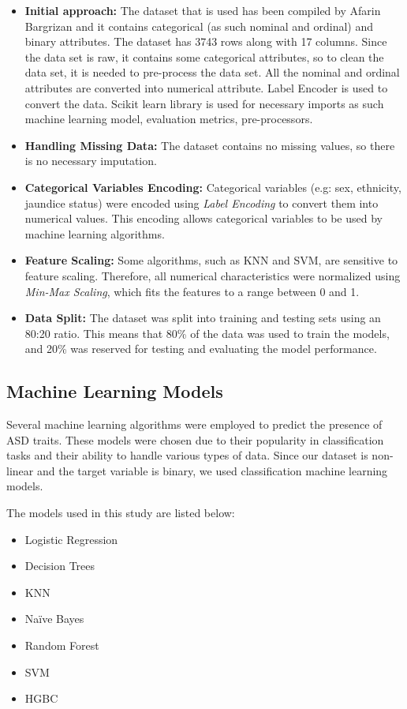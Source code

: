 \documentclass[pdflatex,sn-nature]{sn-jnl}
\theoremstyle{thmstyleone}%
\theoremstyle{thmstyletwo}%
\theoremstyle{thmstylethree}%
\begin{document}
\begin{itemize}
    \item \textbf{Initial approach:} The dataset that is used has been compiled by Afarin Bargrizan and it contains categorical (as such nominal and ordinal) and binary attributes. The dataset has 3743 rows along with 17 columns. Since the data set is raw, it contains some categorical attributes, so to clean the data set, it is needed to pre-process the data set. All the nominal and ordinal attributes are converted into numerical attribute. Label Encoder is used to convert the data. Scikit learn library is used for necessary imports as such machine learning model, evaluation metrics, pre-processors.
    \item \textbf{Handling Missing Data:} The dataset contains no missing values, so there is no necessary imputation.
    \item \textbf{Categorical Variables Encoding:} Categorical variables (e.g: sex, ethnicity, jaundice status) were encoded using \textit{Label Encoding} to convert them into numerical values. This encoding allows categorical variables to be used by machine learning algorithms.
    \item \textbf{Feature Scaling:} Some algorithms, such as KNN and SVM, are sensitive to feature scaling. Therefore, all numerical characteristics were normalized using \textit{Min-Max Scaling}, which fits the features to a range between 0 and 1.
    \item \textbf{Data Split:} The dataset was split into training and testing sets using an 80:20 ratio. This means that 80\% of the data was used to train the models, and 20\% was reserved for testing and evaluating the model performance.
\end{itemize}


\subsection{Machine Learning Models}\label{sec3.4}

Several machine learning algorithms were employed to predict the presence of ASD traits. These models were chosen due to their popularity in classification tasks and their ability to handle various types of data. Since our dataset is non-linear and the target variable is binary, we used classification machine learning models.

The models used in this study are listed below:

\begin{itemize}
    \item Logistic Regression
    \item Decision Trees
    \item KNN
    \item Naïve Bayes
    \item Random Forest
    \item SVM
    \item HGBC
\end{itemize}
    
\end{document}
